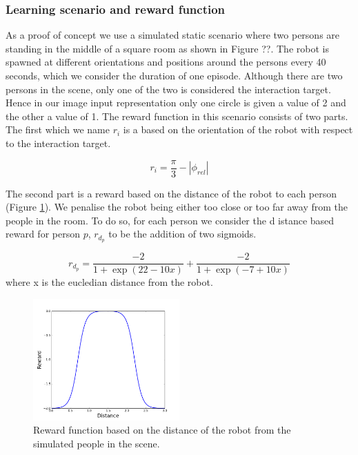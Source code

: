 \documentclass[a4paper,11pt]{report}
\begin{document}
\subsubsection{Learning scenario and reward function}

As a proof of concept we use a simulated static scenario where two persons are standing in the middle of a square room as shown in Figure ??. The robot is spawned at different orientations and positions around the persons every 40 seconds, which we consider the duration of one episode. Although there are two persons in the scene, only one of the two is considered the interaction target. Hence in our image input representation only one circle is given a value of 2 and the other a value of 1. The reward function in this scenario consists of two parts. The first which we name $r_i$ is a based on the orientation of the robot with respect to the interaction target. 

\begin{equation}
	r_i = \frac{\pi}{3} -|\phi_{rel}| 
\end{equation}

The second part is a reward based on the distance of the robot to each person (Figure \ref{fig:rd}). We penalise the robot being either too close or too far away from the people in the room. To do so, for each person we consider the d istance based reward for person $p$, $r_{d_p}$ to be the addition of two sigmoids.

\begin{equation}
	r_{d_p} = \frac{-2}{1+\exp(22-10x)}+ \frac{-2}{1+\exp(-7+10x)} 
\end{equation}
where x is the eucledian distance from the robot.

	\begin{figure}
	\centering
	    \includegraphics[width=0.5\textwidth]{figures/rd.png}
	  \caption[Distance based reward function]{Reward function based on the distance of the robot from the simulated people in the scene.}
	  \label{fig:rd}
	\end{figure}
	
\end{document}
